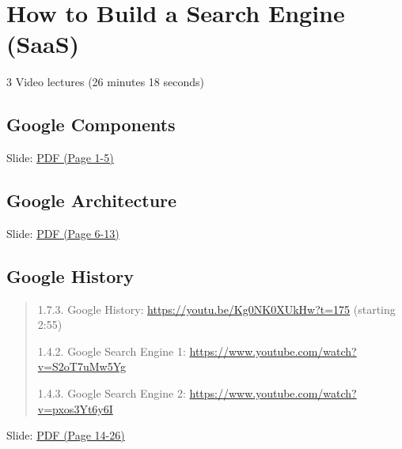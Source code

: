 \section{How to Build a Search Engine
(SaaS)}

  3 Video lectures (26 minutes 18 seconds)

\subsection{Google Components}


  Slide:
  \href{https://drive.google.com/open?id=0B88HKpainTSfYWZ0dDlrNThkVms}{PDF
  (Page 1-5)}

\subsection{Google Architecture}


  Slide:
  \href{https://drive.google.com/open?id=0B88HKpainTSfYWZ0dDlrNThkVms}{PDF
  (Page 6-13)}

\subsection{Google History}

\begin{quote}

  1.7.3. Google History: \url{https://youtu.be/Kg0NK0XUkHw?t=175}
  (starting 2:55)

  1.4.2. Google Search Engine 1:
  \url{https://www.youtube.com/watch?v=S2oT7uMw5Yg}

  1.4.3. Google Search Engine 2:
  \url{https://www.youtube.com/watch?v=pxos3Yt6y6I}

\end{quote}



  Slide:
  \href{https://drive.google.com/open?id=0B88HKpainTSfYWZ0dDlrNThkVms}{PDF
  (Page 14-26)}

